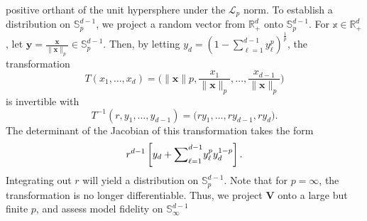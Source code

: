 \documentclass[20pt, a0paper, landscape, colspace=9mm, subcolspace=4mm, blockverticalspace=9mm, innermargin=8mm, margin=0mm]{tikzposter}
\begin{document}
\begin{columns}
{        positive orthant of the unit hypersphere under the $\mathcal{L}_p$ norm.  
        To establish a distribution on $\mathbb{S}_p^{d-1}$, we project a random 
        vector from $\mathbb{R}_+^d$ onto $\mathbb{S}_p^{d-1}$.  For 
        $\mathbb{x}\in\mathbb{R}_+^d$, let 
        $\bm{y} = \frac{\bm{x}}{\lVert\bm{x}\rVert_p} \in \mathbb{S}_p^{d-1}$.  Then, by letting 
        $y_d = \left(1 - \sum_{\ell = 1}^{d-1}y_{\ell}^p\right)^{\frac{1}{p}}$, the
        transformation
        \[T(x_1,\ldots,x_d) = \bigg(\lVert \bm{x}\rVert p, \frac{x_1}{\lVert \bm{x}\rVert_p}, 
                \ldots, \frac{x_{d-1}}{\lVert \bm{x}\rVert_p}\bigg)\]
        is invertible with
        \[T^{-1}(r,y_1,\ldots,y_{d-1}) = 
            \big(ry_1,\ldots,ry_{d-1},ry_d\big).\]
        The determinant of the Jacobian of this transformation takes the form
        \[r^{d-1}\left[y_d +
            {\tiny\sum}_{\ell = 1}^{d-1}y_{\ell}^py_d^{1 - p}\right].\]
        Integrating out $r$ will yield a distribution on $\mathbb{S}_p^{d-1}$.
        Note that for $p=\infty$, the transformation is no longer differentiable.  Thus, we 
        project $\bm{V}$ onto a large but finite $p$, and assess model fidelity on 
        $\mathbb{S}_{\infty}^{d-1}$
        }
   


\end{columns}
\end{document}
